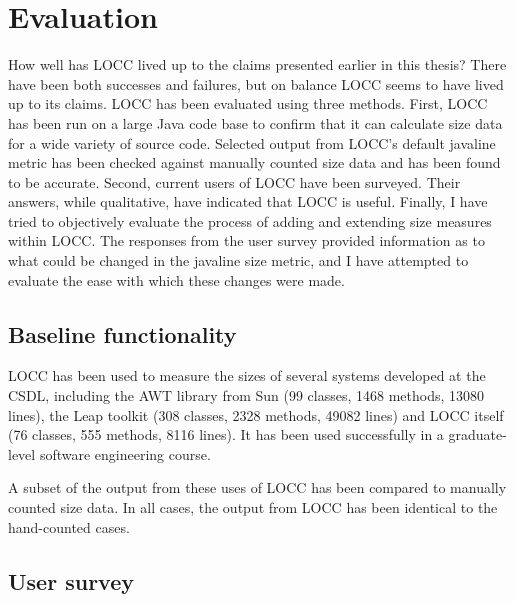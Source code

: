 

\chapter{Evaluation}
\label{chap:eval}

How well has LOCC lived up to the claims presented earlier in this
thesis?  There have been both successes and failures, but on balance
LOCC seems to have lived up to its claims.  LOCC has been evaluated
using three methods. First, LOCC has been run on a large Java code base to
confirm that it can calculate size data for a wide variety of source code.
Selected output from LOCC's
default {\sc javaline} metric has been checked against manually
counted size data and has been found to be accurate.  Second,
current users of LOCC have been surveyed.  Their answers, while
qualitative, have indicated that LOCC is useful.
Finally, I have tried to objectively evaluate the process of adding
and extending size measures within LOCC.  The responses from the user
survey provided information as to what could be changed in the {\sc
  javaline} size metric, and I have attempted to evaluate the ease
with which these changes were made.

\section{Baseline functionality}

LOCC has been used to measure the sizes of several systems developed
at the CSDL, including the AWT library from Sun (99 classes, 1468 methods,
13080 lines), the Leap toolkit (308 classes, 2328 methods, 49082 lines) and
LOCC itself (76 classes, 555 methods, 8116 lines).  It has been
used successfully in a graduate-level software engineering course.

A subset of the output from these uses of LOCC has been compared to
manually counted size data.  In all cases, the output from LOCC
has been identical to the hand-counted cases.

\section{User survey}

